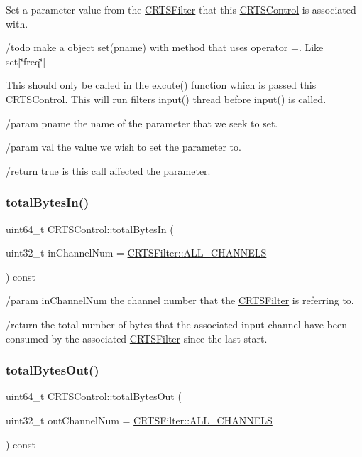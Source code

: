 Set a parameter value from the \hyperlink{classCRTSFilter}{C\+R\+T\+S\+Filter} that this \hyperlink{classCRTSControl}{C\+R\+T\+S\+Control} is associated with.

/todo make a object set(pname) with method that uses operator \textquotesingle{}=\textquotesingle{}. Like set\mbox{[}\char`\"{}freq\char`\"{}\mbox{]}

This should only be called in the excute() function which is passed this \hyperlink{classCRTSControl}{C\+R\+T\+S\+Control}. This will run filters input() thread before input() is called.

/param pname the name of the parameter that we seek to set.

/param val the value we wish to set the parameter to.

/return true is this call affected the parameter. \mbox{\label{classCRTSControl_ad9acd9abb7620a0b34b724b26a47740d}} 
\subsubsection{\texorpdfstring{total\+Bytes\+In()}{totalBytesIn()}}
{\footnotesize\ttfamily uint64\+\_\+t C\+R\+T\+S\+Control\+::total\+Bytes\+In (\begin{DoxyParamCaption}\item[{uint32\+\_\+t}]{in\+Channel\+Num = {\ttfamily \hyperlink{classCRTSFilter_a9ea354654e8e2e8ce3bff293cc35fafe}{C\+R\+T\+S\+Filter\+::\+A\+L\+L\+\_\+\+C\+H\+A\+N\+N\+E\+LS}} }\end{DoxyParamCaption}) const\hspace{0.3cm}{\ttfamily [inline]}}

/param in\+Channel\+Num the channel number that the \hyperlink{classCRTSFilter}{C\+R\+T\+S\+Filter} is referring to.

/return the total number of bytes that the associated input channel have been consumed by the associated \hyperlink{classCRTSFilter}{C\+R\+T\+S\+Filter} since the last start. \mbox{\label{classCRTSControl_ae39f48f9761149fabebe68870ec2b8b8}} 
\subsubsection{\texorpdfstring{total\+Bytes\+Out()}{totalBytesOut()}}
{\footnotesize\ttfamily uint64\+\_\+t C\+R\+T\+S\+Control\+::total\+Bytes\+Out (\begin{DoxyParamCaption}\item[{uint32\+\_\+t}]{out\+Channel\+Num = {\ttfamily \hyperlink{classCRTSFilter_a9ea354654e8e2e8ce3bff293cc35fafe}{C\+R\+T\+S\+Filter\+::\+A\+L\+L\+\_\+\+C\+H\+A\+N\+N\+E\+LS}} }\end{DoxyParamCaption}) const\hspace{0.3cm}{\ttfamily [inline]}}

